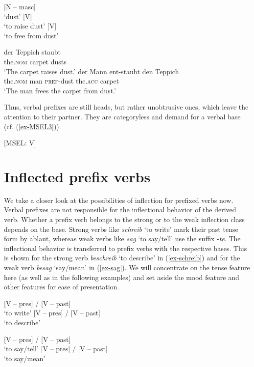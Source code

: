 \documentclass[output=paper
  ,nobabel
  ,draftmode
  ,colorlinks, citecolor=brown
]{langscibook}
\begin{document}
\eal\label{ex-staub}
\ex{} [N – masc]\\`dust'
\ex{} [V]\\`to raise dust'
\ex{} [V]\\`to free from dust'
\zl

\eal\label{ex-staub2}
\ex
\gll der Teppich staubt \\
     the.\textsc{nom} carpet dusts \\
\glt `The carpet raises dust.'
\ex
\gll der             Mann   ent-staubt   den          Teppich \\
the.\textsc{nom}   man      \textsc{pref}-dust    the.\textsc{acc}   carpet \\
\glt `The man frees the carpet from dust.'
\zl

\noindent Thus, verbal prefixes are still heads, but rather unobtrusive ones, which leave the attention to their partner. They are categoryless and demand for a verbal base (cf. (\ref{ex-MSEL3})).

\ea\label{ex-MSEL3}
 [MSEL: V]
\z

\section{Inflected prefix verbs}\label{sec-inflpre}

We take a closer look at the possibilities of inflection for prefixed verbs now. Verbal prefixes are not responsible for the inflectional behavior of the derived verb. Whether a prefix verb belongs to the strong or to the weak inflection class depends on the base. Strong verbs like \emph{schreib} `to write' mark their past tense form by ablaut, whereas weak verbs like \emph{sag} `to say/tell' use the suffix   -\emph{te}. The inflectional behavior is transferred to prefix verbs with the respective bases. This is shown for the strong verb \emph{beschreib} `to describe' in (\ref{ex-schreib}) and for the weak verb \emph{besag} `say/mean' in (\ref{ex-sag}). We will concentrate on the tense feature here (as well as in the following examples) and set aside the mood feature and other features for ease of presentation.

\eal\label{ex-schreib}
\ex{}  {}[V – pres{}] /  {}[V – past{}]\\`to write'
\ex{} {}[V – pres{}] /  {}[V – past{}]\\`to describe'
\zl

\eal\label{ex-sag}
\ex{} {}[V – pres{}] /  {}[V – past{}]\\`to say/tell'
\ex{} {}[V – pres{}] /  {}[V – past{}]\\`to say/mean'
\zl
\end{document}
